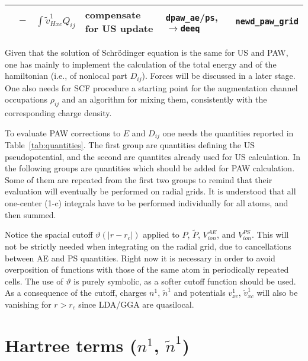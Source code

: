 \documentclass[a4paper,twocolumn,12pt]{article}
\newcommand{\var}[1]{{\tt #1}}
\renewcommand{\theta}{\vartheta}
\begin{document}
\begin{table*}
\begin{small}
\begin{tabular}{|c@{}c@{}l|p{4.5cm}|p{4.5cm}|p{4.0cm}|}
%
$ $ &$-$& $\int{\tilde{v}^1_{Hxc}Q_{ij}}$ & compensate for US update & \var{dpaw\_ae}/\var{ps}, $\rightarrow$\var{deeq} & \var{newd\_paw\_grid}\\
%
\hline
\end{tabular}
\end{small}
\caption{\label{tab:quantities}Quantities needed to perform PAW
calculation on the regular grid}
\end{table*}


Given that the solution of Schr\"odinger equation is the same for US
and PAW, one has mainly to implement the calculation of the total
energy and of the hamiltonian (i.e., of nonlocal part $D_{ij}$).
Forces will be discussed in a later stage.  One also needs for SCF
procedure a starting point for the augmentation channel occupations
$\rho_{ij}$ and an algorithm for mixing them, consistently with the
corresponding charge density.

To evaluate PAW corrections to $E$ and $D_{ij}$ one needs the
quantities reported in Table~\ref{tab:quantities}.  The first group
are quantities defining the US pseudopotential, and the second are
quantites already used for US calculation.  In the following groups
are quantities which should be added for PAW calculation.  Some of
them are repeated from the first two groups to remind that their
evaluation will eventually be performed on radial grids.  It is
understood that all one-center (1-c) integrals have to be performed
individually for all atoms, and then summed.

Notice the spacial cutoff $\theta(|r-r_c|)$ applied to $P$,
$\tilde{P}$, $V^{AE}_{ion}$, and $V^{PS}_{ion}$.  This will not be
strictly needed when integrating on the radial grid, due to
cancellations between AE and PS quantities.  Right now it is necessary
in order to avoid overposition of functions with those of the same
atom in periodically repeated cells.  The use of $\theta$ is purely
symbolic, as a softer cutoff function should be used.  As a
consequence of the cutoff, charges $n^1$, $\tilde{n}^1$ and potentials
$v^1_{xc}$, $\tilde{v}^1_{xc}$ will also be vanishing for $r>r_c$
since LDA/GGA are quasilocal.

\section*{Hartree terms ($n^1$, $\tilde{n}^1$)}
\end{document}
